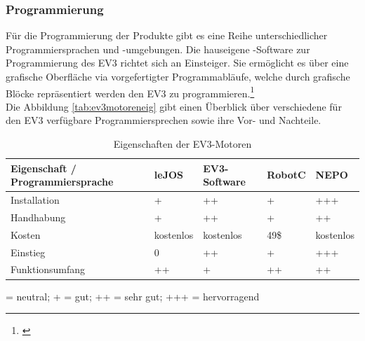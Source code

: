 \subsubsection{Programmierung}
\color{process}
Für die Programmierung der \LM{} Produkte gibt es eine Reihe unterschiedlicher Programmiersprachen und -umgebungen. Die hauseigene \LE{}-Software zur Programmierung des EV3 richtet sich an Einsteiger. Sie ermöglicht es über eine grafische Oberfläche via vorgefertigter Programmabläufe, welche durch grafische Blöcke repräsentiert werden den EV3 zu programmieren.\footnote{\citep[vgl.][EV3-Programmieren mit Java, Seite 25 f.]{Schobel.RobertaEV3Programmieren}\label{note33}} \\
Die Abbildung \eqref{tab:ev3motoreneig} gibt einen Überblick über verschiedene für den EV3 verfügbare Programmiersprechen sowie ihre Vor- und Nachteile.
\begin{table}[ht]
	\begin{tabular}{|p{}|p{}|p{}|p{}|p{}|} \hline
		Eigenschaft / Programmiersprache  & leJOS      & EV3-Software  & RobotC  & NEPO       \\ \hline
		Installation                      & +          & ++            & +       & +++        \\ \hline
		Handhabung    		           	  & +          & ++            & +       & ++         \\ \hline
		Kosten                            & kostenlos  & kostenlos     & 49\$    & kostenlos  \\ \hline
		Einstieg 	                      & 0          & ++            & +       & +++        \\ \hline  
		Funktionsumfang    				  & ++         & +             & ++      & ++         \\ \hline
	\end{tabular}
	\centering
	 = neutral; + = gut; ++ = sehr gut; +++ = hervorragend
	\caption[Eigenschaften der EV3-Motortypen]{Eigenschaften der EV3-Motoren}
	\label{tab:ev3motoreneig}
\end{table}
\newpage
